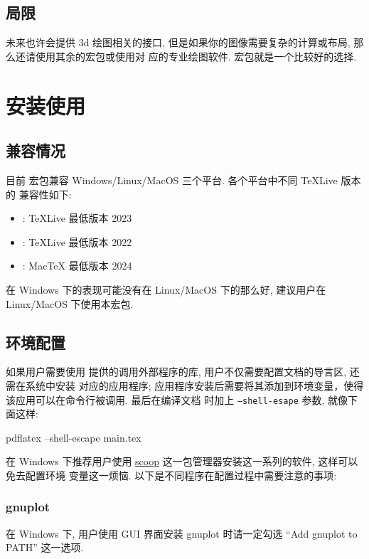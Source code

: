 \documentclass[
  hyper, 
  lang = cn, 
  class = l3doc,
  classOption={11pt},
  sect = {load=false},
]{../../zlatex/code/ztex}
\begin{document}
\subsection{局限}
\zTikZ{} 未来也许会提供 3d 绘图相关的接口, 但是如果你的图像需要复杂的计算或布局, 那么还请使用其余的宏包或使用对
应的专业绘图软件.  宏包就是一个比较好的选择.


\clearpage
\section{安装使用}
\subsection{兼容情况}
目前  宏包兼容 Windows/Linux/MacOS 三个平台. 各个平台中不同 \TeX{}Live 版本的
兼容性如下:

\hspace*{5cm}\parbox{\linewidth}{
\begin{itemize}
  \item [Windows] : \TeX{}Live 最低版本 2023
  \item [Linux] : \TeX{}Live 最低版本 2022
  \item [MacOS] : Mac\TeX{} 最低版本 2024
\end{itemize}}

\ztikz{} 在 Windows 下的表现可能没有在 Linux/MacOS 下的那么好, 建议用户在 Linux/MacOS 下使用本宏包.


\subsection{环境配置}
如果用户需要使用 \zTikZ{} 提供的调用外部程序的库, 用户不仅需要配置文档的导言区, 还需在系统中安装
对应的应用程序; 应用程序安装后需要将其添加到环境变量，使得该应用可以在命令行被调用. 最后在编译文档
时加上 \texttt{--shell-esape} 参数, 就像下面这样:
\def\exampleUR{}

\begin{DocExample}
  pdflatex --shell-escape main.tex
\end{DocExample}

在 Windows 下推荐用户使用 \href{https://scoop.sh/}{scoop} 这一包管理器安装这一系列的软件, 这样可以免去配置环境
变量这一烦恼. 以下是不同程序在配置过程中需要注意的事项:

\vspace*{-.5em}
\subsubsection{gnuplot}
在 Windows 下, 用户使用 GUI 界面安装 gnuplot 时请一定勾选 ``Add gnuplot to PATH'' 这一选项.
\end{document}
